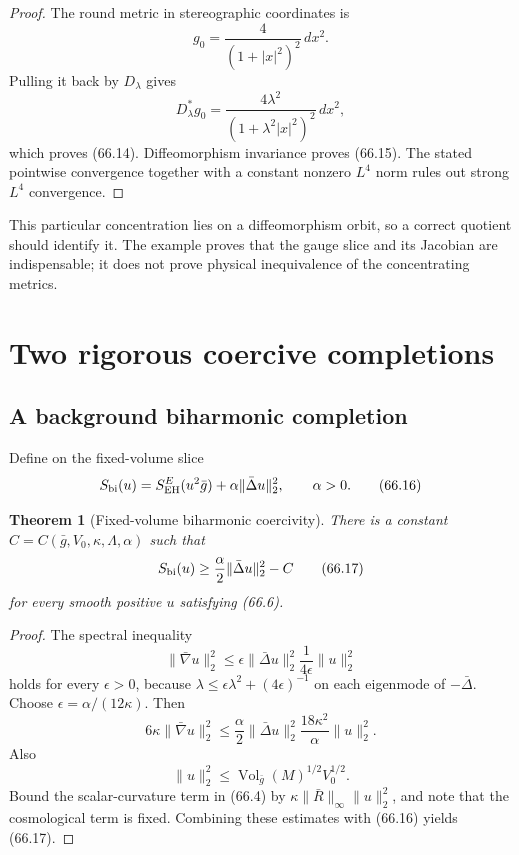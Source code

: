 \documentclass[11pt]{article}
\newtheorem{theorem}{Theorem}[section]
\theoremstyle{remark}
\begin{document}
\begin{proof}
The round metric in stereographic coordinates is
\[
 g_0=\frac{4}{(1+|x|^2)^2}\,dx^2.
\]
Pulling it back by \(D_\lambda\) gives
\[
 D_\lambda^*g_0
 =
 \frac{4\lambda^2}{(1+\lambda^2|x|^2)^2}\,dx^2,
\]
which proves (66.14).  Diffeomorphism invariance proves (66.15).
The stated pointwise convergence together with a constant nonzero
\(L^4\) norm rules out strong \(L^4\) convergence.
\end{proof}

This particular concentration lies on a diffeomorphism orbit, so a
correct quotient should identify it.  The example proves that the
gauge slice and its Jacobian are indispensable; it does not prove
physical inequivalence of the concentrating metrics.

\section{Two rigorous coercive completions}

\subsection{A background biharmonic completion}

Define on the fixed-volume slice
\[
 S_{\rm bi}(u)
 =
 S_{\rm EH}^{E}(u^2\bar g)
 +\alpha\|\bar\Delta u\|_2^2,\qquad \alpha>0.          \tag{66.16}
\]

\begin{theorem}[Fixed-volume biharmonic coercivity]
\label{thm:v15v66-biharmonic}
There is a constant
\(C=C(\bar g,V_0,\kappa,\Lambda,\alpha)\) such that
\[
 S_{\rm bi}(u)
 \geq
 \frac{\alpha}{2}\|\bar\Delta u\|_2^2-C               \tag{66.17}
\]
for every smooth positive \(u\) satisfying (66.6).
\end{theorem}

\begin{proof}
The spectral inequality
\[
 \|\bar\nabla u\|_2^2
 \leq
 \epsilon\|\bar\Delta u\|_2^2
 \frac1{4\epsilon}\|u\|_2^2                           \tag{66.18}
\]
holds for every \(\epsilon>0\), because
\(\lambda\leq\epsilon\lambda^2+(4\epsilon)^{-1}\)
on each eigenmode of \(-\bar\Delta\).  Choose
\(\epsilon=\alpha/(12\kappa)\).  Then
\[
 6\kappa\|\bar\nabla u\|_2^2
 \leq
 \frac{\alpha}{2}\|\bar\Delta u\|_2^2
 \frac{18\kappa^2}{\alpha}\|u\|_2^2.                  \tag{66.19}
\]
Also
\[
 \|u\|_2^2
 \leq\operatorname{Vol}_{\bar g}(M)^{1/2}V_0^{1/2}.   \tag{66.20}
\]
Bound the scalar-curvature term in (66.4) by
\(\kappa\|\bar R\|_\infty\|u\|_2^2\), and note that the
cosmological term is fixed.  Combining these estimates with
(66.16) yields (66.17).
\end{proof}
\end{document}
